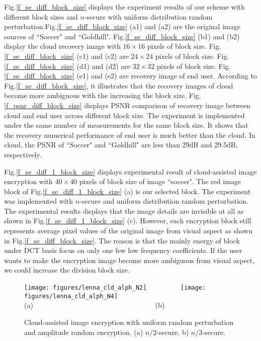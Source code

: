 \documentclass[conference]{IEEEtran}
\begin{document}
Fig.\ref{f_se_diff_block_size} displays the experiment results of our scheme with different block sizes and $n$-secure with uniform distribution random perturbation.Fig.\ref{f_se_diff_block_size} (a1) and (a2) are the original image sources of ``Soccer" and ``Goldhill". Fig.\ref{f_se_diff_block_size} (b1) and (b2) display the cloud recovery image with $16\times 16$ pixels of block size. Fig.\ref{f_se_diff_block_size} (c1) and (c2) are  $24\times 24$ pixels of block size. Fig.\ref{f_se_diff_block_size} (d1) and (d2) are $32\times 32$ pixels of block size. Fig.\ref{f_se_diff_block_size} (e1) and (e2) are recovery image of end user.  According to Fig.\ref{f_se_diff_block_size}, it illustrates that the recovery images of cloud become more ambiguous with the increasing the block size.
Fig.\ref{f_psnr_diff_block_size} displays PSNR comparison of recovery image between cloud and end user across different block size. The experiment is implemented under the same number of measurements for the same block size. It shows that the recovery numerical performance of end user is much better than the cloud. In cloud, the PSNR of ``Soccer" and ``Goldhill" are less than 29dB and 29.5dB, respectively.

Fig.\ref{f_se_diff_1_block_size}  displays experimental result of cloud-assisted image encryption with $40\times 40$ pixels of block size of image ``soccer". The red image block of Fig.\ref{f_se_diff_1_block_size} (a) is our selected block. The experiment was implemented with $n$-secure and  uniform distribution random perturbation. The experimental results displays that the image details are invisible at all as shown in Fig.\ref{f_se_diff_1_block_size} (c).
However, each encryption block still represents average pixel values of the original image from visual aspect as shown in Fig.\ref{f_se_diff_block_size}. The reason is that the mainly energy of block under DCT basis focus on only one few low frequency coefficients. If the user wants to make the encryption image become more ambiguous from visual aspect, we could increase the division block size.

\begin{figure}[t]
  \begin{center}
  \texttt{[image: figures/lenna\_cld\_alph\_N2]}~~~~~~~~~
  \texttt{[image: figures/lenna\_cld\_alph\_N4]}\\
{\footnotesize (a) ~~~~~~~~~~~~~~~~~~~~~~~~~~~~~~~~~~(b)}\\
   \end{center}
  \caption{{\footnotesize Cloud-assisted image encryption with uniform random perturbation and amplitude random encryption. (a) $n/2$-secure. b) $n/3$-secure.}}\label{f_se_alph_uniform}
\end{figure}
\end{document}
